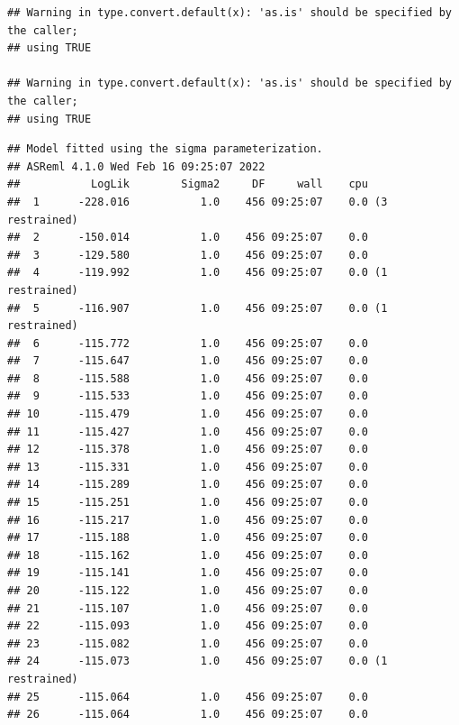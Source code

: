 \documentclass[
  12pt,
]{book}
\newenvironment{Shaded}{\begin{snugshade}}{\end{snugshade}}
\newcommand{\DataTypeTok}[1]{\textcolor[rgb]{0.13,0.29,0.53}{#1}}
\newcommand{\DecValTok}[1]{\textcolor[rgb]{0.00,0.00,0.81}{#1}}
\newcommand{\KeywordTok}[1]{\textcolor[rgb]{0.13,0.29,0.53}{\textbf{#1}}}
\newcommand{\NormalTok}[1]{#1}
\newcommand{\OperatorTok}[1]{\textcolor[rgb]{0.81,0.36,0.00}{\textbf{#1}}}
\newcommand{\OtherTok}[1]{\textcolor[rgb]{0.56,0.35,0.01}{#1}}
\newcommand{\StringTok}[1]{\textcolor[rgb]{0.31,0.60,0.02}{#1}}
\begin{document}
\begin{verbatim}
## Warning in type.convert.default(x): 'as.is' should be specified by the caller;
## using TRUE

## Warning in type.convert.default(x): 'as.is' should be specified by the caller;
## using TRUE
\end{verbatim}

\begin{verbatim}
## Model fitted using the sigma parameterization.
## ASReml 4.1.0 Wed Feb 16 09:25:07 2022
##           LogLik        Sigma2     DF     wall    cpu
##  1      -228.016           1.0    456 09:25:07    0.0 (3 restrained)
##  2      -150.014           1.0    456 09:25:07    0.0
##  3      -129.580           1.0    456 09:25:07    0.0
##  4      -119.992           1.0    456 09:25:07    0.0 (1 restrained)
##  5      -116.907           1.0    456 09:25:07    0.0 (1 restrained)
##  6      -115.772           1.0    456 09:25:07    0.0
##  7      -115.647           1.0    456 09:25:07    0.0
##  8      -115.588           1.0    456 09:25:07    0.0
##  9      -115.533           1.0    456 09:25:07    0.0
## 10      -115.479           1.0    456 09:25:07    0.0
## 11      -115.427           1.0    456 09:25:07    0.0
## 12      -115.378           1.0    456 09:25:07    0.0
## 13      -115.331           1.0    456 09:25:07    0.0
## 14      -115.289           1.0    456 09:25:07    0.0
## 15      -115.251           1.0    456 09:25:07    0.0
## 16      -115.217           1.0    456 09:25:07    0.0
## 17      -115.188           1.0    456 09:25:07    0.0
## 18      -115.162           1.0    456 09:25:07    0.0
## 19      -115.141           1.0    456 09:25:07    0.0
## 20      -115.122           1.0    456 09:25:07    0.0
## 21      -115.107           1.0    456 09:25:07    0.0
## 22      -115.093           1.0    456 09:25:07    0.0
## 23      -115.082           1.0    456 09:25:07    0.0
## 24      -115.073           1.0    456 09:25:07    0.0 (1 restrained)
## 25      -115.064           1.0    456 09:25:07    0.0
## 26      -115.064           1.0    456 09:25:07    0.0
\end{verbatim}

\begin{Shaded}
\end{Shaded}
\end{document}
